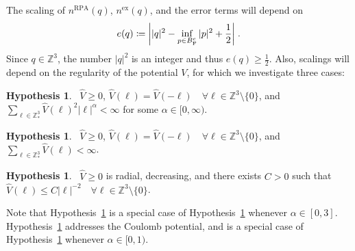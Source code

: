 \documentclass[12pt,a4paper]{article}
\numberwithin{equation}{section}
\newcommand{\1}{\mathbb{I}}
\newcommand{\ex}{\mathrm{ex}}
\newcommand{\F}{\mathrm{F}}
\newcommand{\RPA}{\mathrm{RPA}}
\newcommand{\Z}{\mathbb{Z}}
\newcommand{\half}{\frac{1}{2}}
\theoremstyle{plain}
\theoremstyle{definition}
\newtheorem{hypothesis}[theorem]{Hypothesis}
\theoremstyle{remark}
\theoremstyle{plain}
\theoremstyle{definition}
\theoremstyle{remark}
\begin{document}
The scaling of $ n^{\RPA}(q) $, $ n^{\ex}(q) $, and the error terms will depend on
\begin{equation} \label{eq:eq}
	e(q)
	\coloneq \abs{|q|^2 - \inf_{p \in B_{\F}^c} |p|^2 + \half} \;.
\end{equation}
Since $ q \in \Z^3 $, the number $ |q|^2 $ is an integer and thus $ e(q) \ge \half $.
Also, scalings will depend on the regularity of the potential $ V $, for which we investigate three cases:
\begin{hypothesis}~\label{hyp:alpha}
$ \hat{V} \ge 0 $, $ \hat{V}(\ell) = \hat{V}(-\ell) \quad \forall \ell \in \Z^3 \setminus \{0\} $, and $ \sum_{\ell \in \Z^3_*} \hat{V}(\ell)^2 |\ell|^\alpha < \infty $ for some $ \alpha \in [0,\infty) $.
\end{hypothesis}
\begin{hypothesis}~\label{hyp:ell1}
$ \hat{V} \ge 0 $, $ \hat{V}(\ell) = \hat{V}(-\ell) \quad \forall \ell \in \Z^3 \setminus \{0\} $, and $ \sum_{\ell \in \Z^3_*} \hat{V}(\ell) < \infty $.
\end{hypothesis}
\begin{hypothesis}~\label{hyp:Coulomb}
$ \hat{V} \ge 0 $ is radial, decreasing, and there exists $ C > 0 $ such that\\
$ \hat{V}(\ell) \le C |\ell|^{-2} \quad \forall \ell \in \Z^3 \setminus \{0\} $.
\end{hypothesis}
Note that Hypothesis~\ref{hyp:ell1} is a special case of Hypothesis~\ref{hyp:alpha} whenever $ \alpha \in [0,3] $. Hypothesis~\ref{hyp:ell1} addresses the Coulomb potential, and is a special case of Hypothesis~\ref{hyp:alpha} whenever $ \alpha \in [0,1) $.
\end{document}
